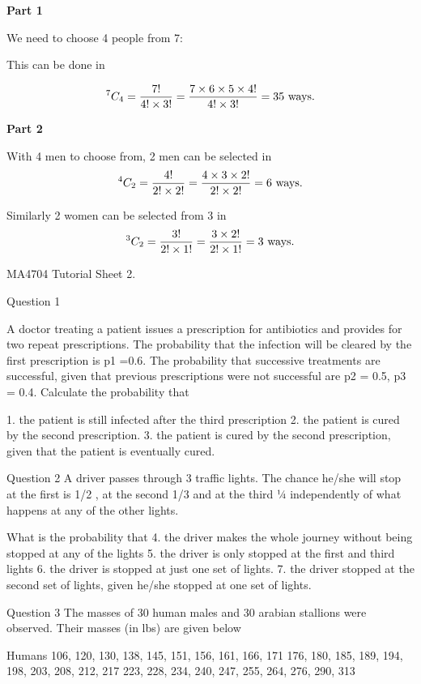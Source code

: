\documentclass[12pt]{report}
\begin{document}
	{\Large
		
		\textbf{Part 1}
		
		We need to choose 4 people from 7:
		
		This can be done in
		
		\[
		^7 C_4  = {7!  \over 4! \times 3!} =  {7 \times 6 \times 5 \times 4!  \over 4! \times 3!} = 35 \mbox{ ways.}
		\]
		
		
		\textbf{Part 2}
		
		With 4 men to choose from, 2 men can be selected in \[
		^4 C_2  = {4!  \over 2! \times 2!} =  {4 \times 3 \times 2!  \over 2! \times 2!} = 6\mbox{ ways.}
		\]
		
		Similarly 2 women can be selected from 3 in
		\[
		^3 C_2  = {3!  \over 2! \times1!} =  {3 \times 2!  \over 2! \times 1!} = 3\mbox{ ways.}
		\]
		
	}
	MA4704 Tutorial Sheet 2. 


Question 1

A doctor treating a patient issues a prescription for antibiotics and provides for two repeat prescriptions. The probability that the infection will be cleared by the first prescription is p1 =0.6. 
The probability that successive treatments are successful, given that previous prescriptions were not successful are p2 = 0.5, p3 = 0.4. Calculate the probability that  
   
1.	the patient is still infected after the third prescription
2.	the patient is cured by the second prescription.
3.	the patient is cured by the second prescription, given that the patient is eventually cured.


Question 2
A driver passes through 3 traffic lights. The chance he/she will stop at the first is 1/2 , at the second 1/3 and at the third ¼ independently of what happens at any of the other lights. 

What is the probability that
4.	the driver makes the whole journey without being stopped at any of the lights
5.	the driver is only stopped at the first and third lights
6.	the driver is stopped at just one set of lights.
7.	the driver stopped at the second set of lights, given he/she stopped at one set of lights.

Question 3
The masses of 30 human males and 30 arabian stallions were observed. Their masses (in lbs) are given below

Humans
106, 120, 130, 138, 145, 151, 156, 161, 166, 171
176, 180, 185, 189, 194, 198, 203, 208, 212, 217
223, 228, 234, 240, 247, 255, 264, 276, 290, 313
\end{document}
